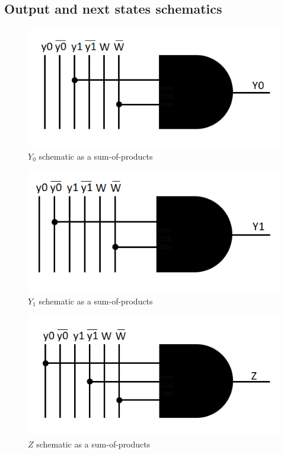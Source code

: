 \documentclass[../../e3_tp3_main.tex]{subfiles}
\begin{document}
\subsection{Output and next states schematics}
\begin{figure}[H]
	\centering
	\includegraphics{figures/ej2_Y0_schem_mealy.PNG}
	\caption{$Y_0$ schematic as a sum-of-products}
\end{figure}
\begin{figure}[H]
	\centering
	\includegraphics{figures/ej2_Y1_schem_mealy.PNG}
	\caption{$Y_1$ schematic as a sum-of-products}
\end{figure}
\begin{figure}[H]
	\centering
	\includegraphics{figures/ej2_Z_schem_mealy.PNG}
	\caption{$Z$ schematic as a sum-of-products}
\end{figure}
\end{document}
